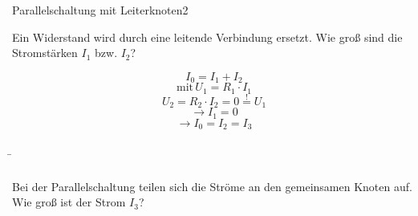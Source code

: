 \begin{frame}
{		
		
		\begin{bsp}{Parallelschaltung mit Leiter}{knoten2}
			
			Ein Widerstand wird durch eine leitende Verbindung ersetzt.
			Wie groß sind die Stromstärken  $I_1$ bzw. $I_2$?\\
			
			\begin{center}
				
			\end{center}
			
			\begin{equation*}
				I_0=I_1+I_2
			\end{equation*}
			\begin{equation*}
				\mathrm{mit} \, U_1 = R_1 \cdot I_1
			\end{equation*}
			\begin{equation*}
				U_2 = R_2 \cdot I_2 =0 \stackrel{!}{=} U_1
			\end{equation*}
			\begin{equation*}
				\rightarrow I_1 = 0
			\end{equation*}
			\begin{equation*}
				\rightarrow I_0 = I_2 = I_3
			\end{equation*}
			
			
			
			
			
			
		\end{bsp}
	}
	\b{
	
		\begin{columns}
			
			
			
			
			
			Bei der Parallelschaltung teilen sich die Ströme an den gemeinsamen
			Knoten auf. Wie groß ist der Strom $I_3$?\\
			
			
			
			
			
		\end{columns}
		\begin{columns}
			\column[t]{0.6\textwidth}
			\vspace{-50pt}
			
			
			
			
			\pause
			

\end{columns}}
\end{frame}
